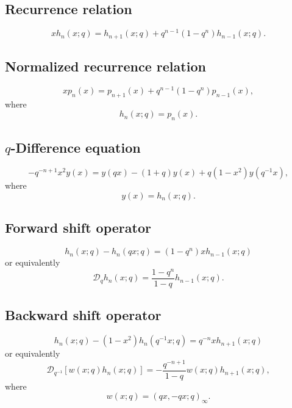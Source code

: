 \documentclass[envcountchap,graybox]{svmono}
\begin{document}
\subsection*{Recurrence relation}
\begin{equation}
\label{RecDiscreteqHermiteI}
xh_n(x;q)=h_{n+1}(x;q)+q^{n-1}(1-q^n)h_{n-1}(x;q).
\end{equation}

\subsection*{Normalized recurrence relation}
\begin{equation}
\label{NormRecDiscreteqHermiteI}
xp_n(x)=p_{n+1}(x)+q^{n-1}(1-q^n)p_{n-1}(x),
\end{equation}
where
$$h_n(x;q)=p_n(x).$$

\subsection*{$q$-Difference equation}
\begin{equation}
\label{dvDiscreteqHermiteI}
-q^{-n+1}x^2y(x)=y(qx)-(1+q)y(x)+q(1-x^2)y(q^{-1}x),
\end{equation}
where
$$y(x)=h_n(x;q).$$

\subsection*{Forward shift operator}
\begin{equation}
\label{shift1DiscreteqHermiteI-I}
h_n(x;q)-h_n(qx;q)=(1-q^n)xh_{n-1}(x;q)
\end{equation}
or equivalently
\begin{equation}
\label{shift1DiscreteqHermiteI-II}
\mathcal{D}_qh_n(x;q)=\frac{1-q^n}{1-q}h_{n-1}(x;q).
\end{equation}

\subsection*{Backward shift operator}
\begin{equation}
\label{shift2DiscreteqHermiteI-I}
h_n(x;q)-(1-x^2)h_n(q^{-1}x;q)=q^{-n}xh_{n+1}(x;q)
\end{equation}
or equivalently
\begin{equation}
\label{shift2DiscreteqHermiteI-II}
\mathcal{D}_{q^{-1}}\left[w(x;q)h_n(x;q)\right]
=-\frac{q^{-n+1}}{1-q}w(x;q)h_{n+1}(x;q),
\end{equation}
where
$$w(x;q)=(qx,-qx;q)_{\infty}.$$
\end{document}

